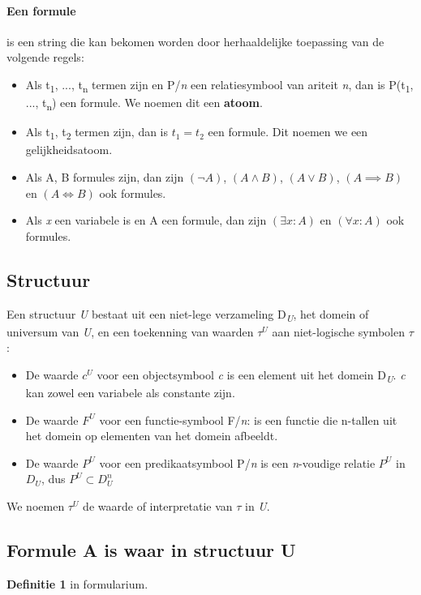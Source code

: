 \documentclass[11pt, a4paper]{article}
\begin{document}
\paragraph{Een formule} is een string die kan bekomen worden door herhaaldelijke toepassing van de volgende regels: \begin{itemize}
\item Als t\textsubscript{1}, ..., t\textsubscript{n} termen zijn en P/\textit{n} een relatiesymbool van ariteit \textit{n}, dan is P(t\textsubscript{1}, ..., t\textsubscript{n}) een formule. We noemen dit een \textbf{atoom}.
\item Als t\textsubscript{1}, t\textsubscript{2} termen zijn, dan is $t_1 = t_2$ een formule. Dit noemen we een gelijkheidsatoom.
\item Als A, B formules zijn, dan zijn $(\neg A)$, $(A\land B)$, $(A\lor B)$, $(A\implies B)$ en $(A\iff B)$ ook formules.
\item Als \textit{x} een variabele is en A een formule, dan zijn $(\exists x: A)$ en $(\forall x: A) $ ook formules.
\end{itemize}

\subsection*{Structuur}
Een structuur \textit{U} bestaat uit een niet-lege verzameling D\textsubscript{\textit{U}}, het domein of universum van \textit{U}, en een toekenning van waarden $\tau^\textit{U}$ aan niet-logische symbolen $\tau$:\begin{itemize}
\item De waarde $c^\textit{U}$ voor een objectsymbool \textit{c} is een element uit het domein D\textsubscript{\textit{U}}. \textit{c} kan zowel een variabele als constante zijn.
\item De waarde $F^\textit{U}$ voor een functie-symbool F/\textit{n}: is een functie die n-tallen uit het domein op elementen van het domein afbeeldt.
\item De waarde $P^\textit{U}$ voor een predikaatsymbool P/\textit{n} is een \textit{n}-voudige relatie $P^\textit{U}$ in $D_\textit{U}$, dus $P^\textit{U} \subset  D_\textit{U}^\textit{n}$
\end{itemize}
We noemen $\tau^\textit{U}$ de waarde of interpretatie van $\tau$ in \textit{U}.

\subsection*{Formule A is waar in structuur U}
\textbf{Definitie 1} in formularium.
\end{document}
